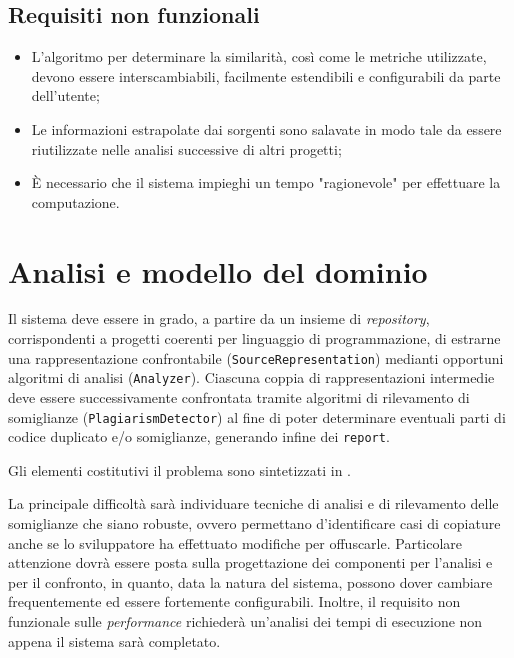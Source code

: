 \subsection*{Requisiti non funzionali}
\begin{itemize}
    \item L'algoritmo per determinare la similarità, così come le metriche utilizzate, devono essere interscambiabili, facilmente estendibili e configurabili da parte dell'utente;
    \item Le informazioni estrapolate dai sorgenti sono salavate in modo tale da essere riutilizzate nelle analisi successive di altri progetti;
    \item \`E necessario che il sistema impieghi un tempo "ragionevole" per effettuare la computazione.
\end{itemize}

\section{Analisi e modello del dominio}
Il sistema deve essere in grado, a partire da un insieme di \textit{repository}, corrispondenti a progetti coerenti per linguaggio di programmazione, di estrarne una rappresentazione confrontabile (\texttt{SourceRepresentation}) medianti opportuni algoritmi di analisi (\texttt{Analyzer}).
%
Ciascuna coppia di rappresentazioni intermedie deve essere successivamente confrontata tramite algoritmi di rilevamento di somiglianze (\texttt{PlagiarismDetector}) al fine di poter determinare eventuali parti di codice duplicato e/o somiglianze, generando infine dei \texttt{report}.

Gli elementi costitutivi il problema sono sintetizzati in .

La principale difficoltà sarà individuare tecniche di analisi e di rilevamento delle somiglianze che siano robuste, ovvero permettano d'identificare casi di copiature anche se lo sviluppatore ha effettuato modifiche per offuscarle.
%
Particolare attenzione dovrà essere posta sulla progettazione dei componenti per l'analisi e per il confronto, in quanto, data la natura del sistema, possono dover cambiare frequentemente ed essere fortemente configurabili.
%
Inoltre, il requisito non funzionale sulle \textit{performance} richiederà un'analisi dei tempi di esecuzione non appena il sistema sarà completato.

